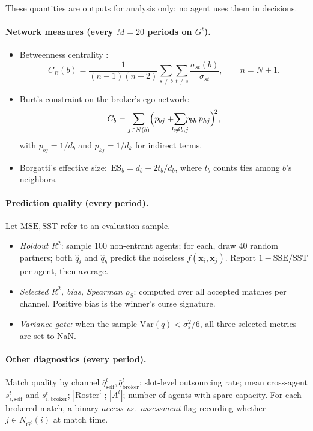 \documentclass[11pt]{article}
\newcommand{\x}{\mathbf{x}}
\newcommand{\Roster}{\mathrm{Roster}}
\newcommand{\qhat}{\hat{q}}
\newcommand{\self}{\mathrm{self}}
\newcommand{\brk}{\mathrm{broker}}
\newcommand{\Ntot}{N}
\begin{document}
These quantities are outputs for analysis only; no agent uses them in decisions.

\paragraph{Network measures (every $M=20$ periods on $G^t$).}
\begin{itemize}[leftmargin=*,itemsep=2pt]
\item Betweenness centrality \cite{brandes2001}:
\[
C_B(b) = \frac{1}{(n-1)(n-2)}\sum_{s\neq b}\sum_{t\neq s}\frac{\sigma_{st}(b)}{\sigma_{st}},\qquad n=\Ntot+1.
\]
\item Burt's constraint on the broker's ego network:
\[
C_b = \sum_{j\in N(b)}\Bigl(p_{bj} + \!\!\!\sum_{h\neq b,j}\!\!\! p_{bh}\,p_{hj}\Bigr)^{\!2},
\]
with $p_{bj}=1/d_b$ and $p_{kj}=1/d_k$ for indirect terms.
\item Borgatti's effective size:\ $\mathrm{ES}_b = d_b - 2t_b/d_b$, where $t_b$ counts ties among $b$'s neighbors.
\end{itemize}

\paragraph{Prediction quality (every period).} Let $\mathrm{MSE}, \mathrm{SST}$ refer to an evaluation sample.
\begin{itemize}[leftmargin=*,itemsep=2pt]
\item \emph{Holdout $R^2$}: sample $100$ non-entrant agents; for each, draw $40$ random partners; both $\qhat_i$ and $\qhat_b$ predict the noiseless $f(\x_i,\x_j)$. Report $1-\mathrm{SSE}/\mathrm{SST}$ per-agent, then average.
\item \emph{Selected $R^2$, bias, Spearman $\rho_S$}: computed over all accepted matches per channel. Positive bias is the winner's curse signature.
\item \emph{Variance-gate:} when the sample $\mathrm{Var}(q) < \sigma_\varepsilon^2/6$, all three selected metrics are set to NaN.
\end{itemize}

\paragraph{Other diagnostics (every period).} Match quality by channel $\bar q_\self^t, \bar q_{\brk}^t$; slot-level outsourcing rate; mean cross-agent $s_{i,\self}^t$ and $s_{i,\brk}^t$; $|\Roster^t|$; $|A^t|$; number of agents with spare capacity. For each brokered match, a binary \emph{access vs.\ assessment} flag recording whether $j \in N_{G^t}(i)$ at match time.
\end{document}
